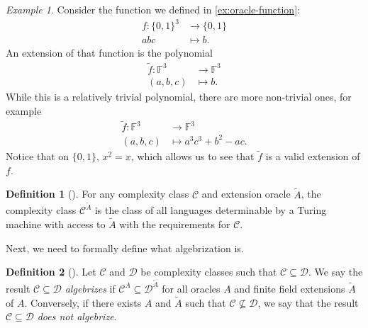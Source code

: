 \documentclass[english,12pt]{reedthesis}
\theoremstyle{plain}
\theoremstyle{definition}
\newtheorem{defn}[defn]{Definition}
\theoremstyle{remark}
\newtheorem{example}{Example}[thm]
\begin{document}
\begin{example}\label{ex:oracle-function-ext}
  Consider the function we defined in \cref{ex:oracle-function}:
  \begin{equation}
    \begin{aligned}
      f\colon \{0, 1\}^{3} &\rightarrow \{0, 1\} \\
      abc &\mapsto b.
    \end{aligned}
  \end{equation}
  An extension of that function is the polynomial
  \begin{equation}
    \begin{aligned}
      \tilde{f}\colon \mathbb{F}^{3} &\rightarrow \mathbb{F}^{3} \\
      (a,b,c) &\mapsto b.
    \end{aligned}
  \end{equation}
  While this is a relatively trivial polynomial, there are more non-trivial
  ones, for example
  \begin{equation}
    \begin{aligned}
      \tilde{f}\colon \mathbb{F}^{3} &\rightarrow \mathbb{F}^{3} \\
      (a,b,c) &\mapsto a^{3}c^{3} + b^{2} - ac.
    \end{aligned}
  \end{equation}
  Notice that on $\{0, 1\}$, $x^{2} = x$, which allows us to see that
  $\tilde{f}$ is a valid extension of $f$.
\end{example}


\begin{defn}[{\cite[Def.\ 2.2]{AW09}}]\label{def:ext-oracle-class}
  For any complexity class $\mathcal{C}$ and extension oracle $\tilde{A}$, the complexity
  class $\mathcal{C}^{\tilde{A}}$ is the class of all languages determinable by a Turing
  machine with access to $\tilde{A}$ with the requirements for $\mathcal{C}$.
\end{defn}

Next, we need to formally define what algebrization is.

\begin{defn}[{\cite[Def.\ 2.3]{AW09}}]\label{def:algebrization}
  Let $\mathcal{C}$ and $\mathcal{D}$ be complexity classes such that $\mathcal{C} \subseteq \mathcal{D}$. We say the result
  $\mathcal{C} \subseteq \mathcal{D}$ \emph{algebrizes} if $\mathcal{C}^{A} \subseteq \mathcal{D}^{\tilde{A}}$ for all oracles $A$ and
  finite field extensions $\tilde{A}$ of $A$. Conversely, if there exists $A$
  and $\tilde{A}$ such that $\mathcal{C} \nsubseteq \mathcal{D}$, we say that the result $\mathcal{C} \subseteq \mathcal{D}$ \emph{does
    not algebrize}.
\end{defn}
\end{document}
